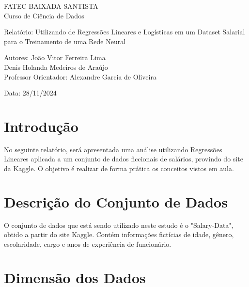 \documentclass{article}
\begin{document}
\date{} %
\begin{titlepage}
    \begin{center}
        \LARGE FATEC BAIXADA SANTISTA \\ Curso de Ciência de Dados\\
        
        \vspace{8cm}
        
        \LARGE Relatório: Utilizando de Regressões Lineares e Logísticas em um Dataset Salarial para o Treinamento de uma Rede Neural\\
        
        \vspace{8cm}
        
        \large Autores: João Vitor Ferreira Lima\\
        Denis Holanda Medeiros de Araújo \\
Professor Orientador: Alexandre Garcia de Oliveira \\
        
        \vspace{2cm}
        
        \large Data: 28/11/2024
    \end{center}
\end{titlepage}
\maketitle


\section{Introdução}

No seguinte relatório, será apresentada uma análise utilizando Regressões Lineares aplicada a um conjunto de dados ficcionais de salários, provindo do site da Kaggle. O objetivo é realizar de forma prática os conceitos vistos em aula.

\section{Descrição do Conjunto de Dados}

O conjunto de dados que está sendo utilizado neste estudo é o "Salary-Data", obtido a partir do site Kaggle. Contém informações fictícias de idade, gênero, escolaridade, cargo e anos de experiência de funcionário.

\section{Dimensão dos Dados}
\end{document}
